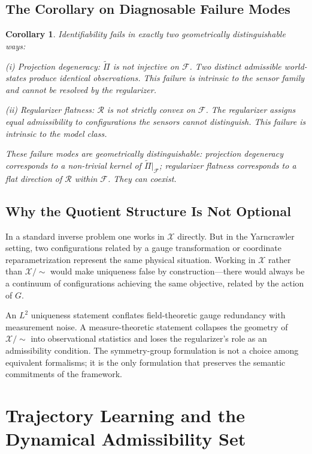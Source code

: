 \documentclass[11pt, oneside]{article}
\newtheorem{corollary}[theorem]{Corollary}
\newcommand{\Xmod}{\mathcal{X}/{\sim}}
\newcommand{\Ftil}{\widetilde{\Pi}}
\begin{document}
\subsection{The Corollary on Diagnosable Failure Modes}

\begin{corollary}
\label{cor:failures}
Identifiability fails in exactly two geometrically distinguishable ways:

\emph{(i) Projection degeneracy}: $\Ftil$ is not injective on $\mathcal{F}$. Two distinct
admissible world-states produce identical observations. This failure is intrinsic to the
sensor family and cannot be resolved by the regularizer.

\emph{(ii) Regularizer flatness}: $\mathcal{R}$ is not strictly convex on $\mathcal{F}$.
The regularizer assigns equal admissibility to configurations the sensors cannot
distinguish. This failure is intrinsic to the model class.

These failure modes are geometrically distinguishable: projection degeneracy corresponds
to a non-trivial kernel of $\Ftil|_{\mathcal{F}}$; regularizer flatness corresponds to a
flat direction of $\mathcal{R}$ within $\mathcal{F}$. They can coexist.
\end{corollary}

\subsection{Why the Quotient Structure Is Not Optional}

In a standard inverse problem one works in $\mathcal{X}$ directly. But in the Yarncrawler
setting, two configurations related by a gauge transformation or coordinate
reparametrization represent the same physical situation. Working in $\mathcal{X}$ rather
than $\Xmod$ would make uniqueness false by construction---there would always be a
continuum of configurations achieving the same objective, related by the action of $G$.

An $L^2$ uniqueness statement conflates field-theoretic gauge redundancy with measurement
noise. A measure-theoretic statement collapses the geometry of $\Xmod$ into observational
statistics and loses the regularizer's role as an admissibility condition. The
symmetry-group formulation is not a choice among equivalent formalisms; it is the only
formulation that preserves the semantic commitments of the framework.

\section{Trajectory Learning and the Dynamical Admissibility Set}
\label{sec:disambiguation}
\end{document}
